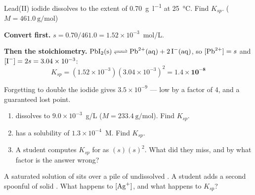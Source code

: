 \documentclass{apchem-notes}
\begin{document}
\begin{workedexample}
Lead(II) iodide dissolves to the extent of \SI{0.70}{\gram\per\litre} at
\SI{25}{\celsius}. Find $K_{sp}$. ($M = \SI{461.0}{\gram\per\mole}$)

\textbf{Convert first.} $s = 0.70/461.0 = 1.52\times10^{-3}$~mol/L.

\textbf{Then the stoichiometry.}
$\ce{PbI2(s) <=> Pb^2+(aq) + 2I^-(aq)}$, so $[\ce{Pb^2+}] = s$ and
$[\ce{I-}] = 2s = 3.04\times10^{-3}$:
\[ K_{sp} = (1.52\times10^{-3})(3.04\times10^{-3})^2
   = \mathbf{1.4\times10^{-8}} \]

Forgetting to double the iodide gives $3.5\times10^{-9}$ --- low by a
factor of 4, and a guaranteed lost point.
\end{workedexample}


\begin{enumerate}[leftmargin=*,itemsep=0.4em]
  \item {} dissolves to $9.0\times10^{-3}$~g/L
        ($M = \SI{233.4}{\gram\per\mole}$). Find $K_{sp}$.
        \workspace[2.6cm]
  \item {} has a solubility of $1.3\times10^{-4}$~M. Find
        $K_{sp}$. \workspace[2.6cm]
  \item A student computes $K_{sp}$ for  as $(s)(s)^2$. What did
        they miss, and by what factor is the answer wrong?
\end{enumerate}

\begin{exitticket}
A saturated solution of  sits over a pile of undissolved
. A student adds a second spoonful of solid . What
happens to $[\ce{Ag+}]$, and what happens to $K_{sp}$?
\end{exitticket}
\end{document}
